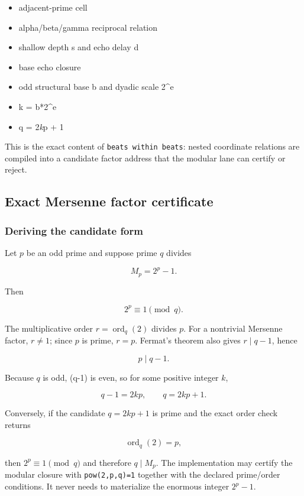 \begin{itemize}
\tightlist
\item
  adjacent-prime cell
\item
  alpha/beta/gamma reciprocal relation
\item
  shallow depth s and echo delay d
\item
  base echo closure
\item
  odd structural base b and dyadic scale 2\^{}e
\item
  k = b*2\^{}e
\item
  q = 2\emph{k}p + 1
\end{itemize}

This is the exact content of \texttt{beats\ within\ beats}: nested
coordinate relations are compiled into a candidate factor address that
the modular lane can certify or reject.

\subsection{Exact Mersenne factor
certificate}\label{viii-ch10-exact-mersenne-factor-certificate}

\subsubsection{Deriving the candidate
form}\label{viii-ch10-deriving-the-candidate-form}

Let \(p\) be an odd prime and suppose prime \(q\) divides

\[
M_p=2^p-1.
\]

Then

\[
2^p\equiv1\pmod q.
\]

The multiplicative order \(r=\operatorname{ord}_q(2)\) divides \(p\).
For a nontrivial Mersenne factor, \(r\ne1\); since \(p\) is prime,
\(r=p\). Fermat's theorem also gives \(r\mid q-1\), hence

\[
p\mid q-1.
\]

Because \(q\) is odd, (q-1) is even, so for some positive integer \(k\),

\[
q-1=2kp,
\qquad
q=2kp+1.
\]

Conversely, if the candidate \(q=2kp+1\) is prime and the exact order
check returns

\[
\operatorname{ord}_q(2)=p,
\]

then \(2^p\equiv1\pmod q\) and therefore \(q\mid M_p\). The
implementation may certify the modular closure with
\texttt{pow(2,p,q)=1} together with the declared prime/order conditions.
It never needs to materialize the enormous integer \(2^p-1\).

